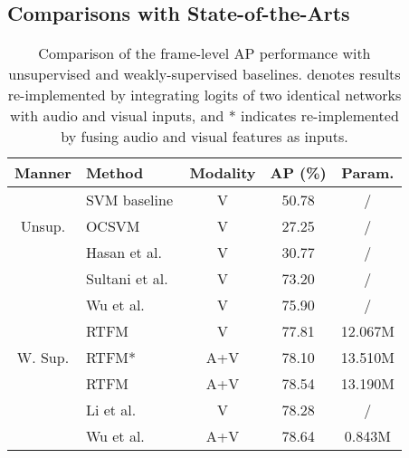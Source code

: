 \documentclass[sigconf]{acmart}
\begin{document}
\subsection{Comparisons with State-of-the-Arts}

\begin{table}[tb]
\caption{Comparison of the frame-level AP performance with unsupervised and weakly-supervised baselines.  denotes results re-implemented by integrating logits of two identical networks with audio and visual inputs, and * indicates re-implemented by fusing audio and visual features as inputs.}
\begin{tabular}{@{}clccc@{}}
\toprule
 Manner                            & Method                                            & Modality       & AP (\%)        & Param.       \\ \midrule
\multirow{3}{*}{Unsup.}            & SVM baseline                                      & V              & 50.78          &   /           \\
                                   & OCSVM~\cite{scholkopf1999support}                 & V              & 27.25          &   /           \\
                                   & Hasan et al.~\cite{hasan2016learning}             & V              & 30.77          &   /           \\ \midrule
\multirow{11}{*}{W. Sup.}          & Sultani et al.~\cite{sultani2018real}             & V              & 73.20          &   /          \\
                                   & Wu et al.~\cite{wu2021learning}                   & V              & 75.90          &   /           \\
                                   & RTFM~\cite{tian2021weakly}                        & V              & 77.81          &  12.067M            \\
                                   & RTFM*~\cite{tian2021weakly}                       & A+V            & 78.10          &  13.510M            \\
                                   & RTFM~\cite{tian2021weakly}               & A+V            & 78.54          &  13.190M           \\ 
                                   & Li et al.~\cite{li2022self}                       & V              & 78.28          &  /            \\
                                   & Wu et al.~\cite{wu2020not}                        & A+V            & 78.64          &  0.843M      \\

\end{tabular}
\end{table}
\end{document}
